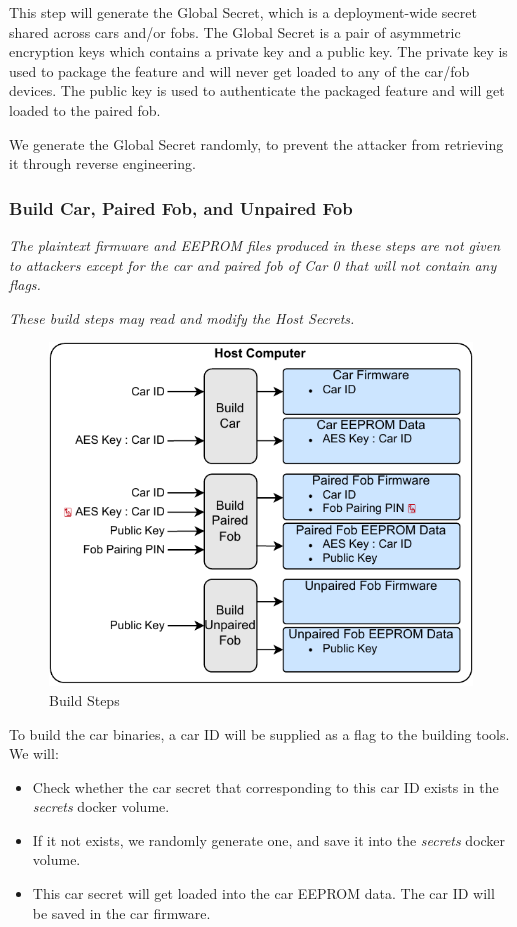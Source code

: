 \documentclass[11pt,oneside,onecolumn,letterpaper]{article}
\begin{document}
This step will generate the Global Secret, which is a deployment-wide secret shared across cars and/or fobs.
The Global Secret is a pair of asymmetric encryption keys which contains a private key and a public key.
The private key is used to package the feature and will never get loaded to any of the car/fob devices.
The public key is used to authenticate the packaged feature and will get loaded to the paired fob.

We generate the Global Secret randomly, to prevent the attacker from retrieving it through reverse engineering.

\subsubsection{Build Car, Paired Fob, and Unpaired Fob}

\textit{The plaintext firmware and EEPROM files produced in these steps are not given to attackers except for the car and paired fob of Car 0 that will not contain any flags.}

\textit{These build steps may read and modify the Host Secrets.}

\begin{figure}[!htbp]
	\begin{centering}
		\includegraphics[width = .6\textwidth]{pic/build_step.pdf}
		\caption{Build Steps}
		\label{fig:build_step}
	\end{centering}
\end{figure}

To build the car binaries, a car ID will be supplied as a flag to the building tools. We will:
\begin{itemize}
	\item Check whether the car secret that corresponding to this car ID exists in the \textit{secrets} docker volume.
	\item If it not exists, we randomly generate one, and save it into the \textit{secrets} docker volume.
	\item This car secret will get loaded into the car EEPROM data. The car ID will be saved in the car firmware.
\end{itemize}
\end{document}
